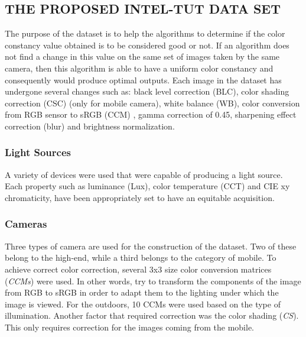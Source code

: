 \subsection{THE PROPOSED INTEL-TUT DATA SET}
The purpose of the dataset is to help the algorithms to determine if the color 
constancy value obtained is to be considered good or not. If an algorithm 
does not find a change in this value on the same set of images taken by the 
same camera, then this algorithm is able to have a uniform color constancy 
and consequently would produce optimal outputs. Each image in the 
dataset has undergone several changes such as: black level correction (BLC), 
color shading correction (CSC) (only for mobile camera), white balance (WB), 
color conversion from RGB sensor to sRGB (CCM) , gamma correction of 
0.45, sharpening effect correction (blur) and brightness normalization.

\subsubsection{Light Sources}
A variety of devices were used that were capable of producing a light source. 
Each property such as luminance (Lux), color temperature (CCT) and CIE 
xy chromaticity, have been appropriately set to have an equitable acquisition.

\subsubsection{Cameras}
Three types of camera are used for the construction of the dataset. Two 
of these belong to the high-end, while a third belongs to the category of 
mobile. To achieve correct color correction, several 3x3 size color 
conversion matrices (\emph{CCMs}) were used. In other words, try to transform 
the components of the image from RGB to sRGB in order to adapt them to 
the lighting under which the image is viewed. For the outdoors, 10 CCMs 
were used based on the type of illumination. Another factor that required 
correction was the color shading (\emph{CS}). This only requires correction for the 
images coming from the mobile.

